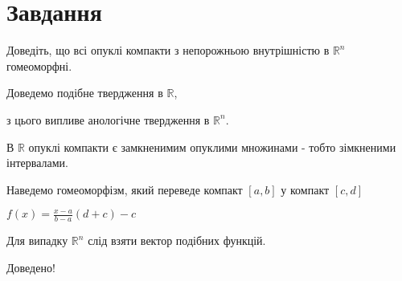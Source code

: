 
\chapter{Завдання \theHchapter}

\begin{tcolorbox}[title=Завдання]
    Доведіть, що всі опуклі компакти з непорожньою
    внутрішністю в $\mathbb{R}^{n}$ гомеоморфні.
\end{tcolorbox}
\label{task2}


Доведемо подібне твердження в $\mathbb{R}$, 


з цього випливе анологічне твердження в $\mathbb{R}^n$.


В $\mathbb{R}$ опуклі компакти є замкненимим опуклими множинами - тобто
зімкненими інтервалами. 


Наведемо гомеоморфізм, який переведе компакт $[a, b]$ у компакт $[c, d]$


$f(x) = \frac{x - a}{b - a} (d + c) - c $


Для випадку $\mathbb{R}^n$ слід взяти вектор подібних функцій.


Доведено!